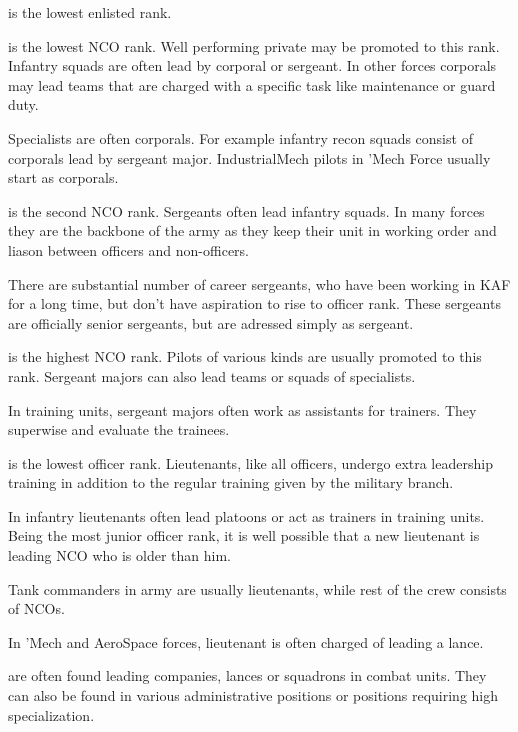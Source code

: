 \documentclass{tufte-book}
\begin{document}
 is the lowest enlisted rank.

 is the lowest NCO rank. Well performing private may be
promoted to this rank. Infantry squads are often lead by corporal or sergeant.
In other forces corporals may lead teams that are charged with a specific
task like maintenance or guard duty.

Specialists are often corporals. For example infantry recon squads consist
of corporals lead by sergeant major. IndustrialMech pilots in 'Mech Force
usually start as corporals.

 is the second NCO rank. Sergeants often lead infantry
squads. In many forces they are the backbone of the army as they keep their
unit in working order and liason between officers and non-officers.

There are substantial number of career sergeants, who have been working in
KAF for a long time, but don't have aspiration to rise to officer rank. These
sergeants are officially senior sergeants, but are adressed simply as
sergeant.

 is the highest NCO rank. Pilots of various kinds
are usually promoted to this rank. Sergeant majors can also lead teams or
squads of specialists.

In training units, sergeant majors often work as assistants for trainers.
They superwise and evaluate the trainees.

 is the lowest officer rank. Lieutenants, like all
officers, undergo extra leadership training in addition to the regular
training given by the military branch.

In infantry lieutenants often lead platoons or act as trainers in training
units. Being the most junior officer rank, it is well possible that a
new lieutenant is leading NCO who is older than him.

Tank commanders in army are usually lieutenants, while rest of the crew
consists of NCOs.

In 'Mech and AeroSpace forces, lieutenant is often charged of leading a
lance.

  are
often found leading companies, lances or squadrons in combat units. They can
also be found in various administrative positions or positions requiring high
specialization.
\end{document}
